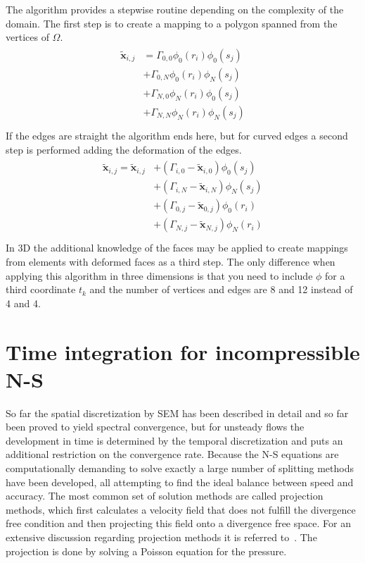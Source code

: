The algorithm provides a stepwise routine depending on the complexity of the domain. The first step is to create 
a mapping to a polygon spanned from the vertices of $\Omega$.
%
\begin{align}
    \begin{split}
    \mathbf{\tilde{x}}_{i,j} 
             &=\Gamma_{0,0}\phi_0(r_i)\phi_0(s_j)\\
             &+\Gamma_{0,N}\phi_0(r_i)\phi_N(s_j)\\
             &+\Gamma_{N,0}\phi_N(r_i)\phi_0(s_j)\\
             &+\Gamma_{N,N}\phi_N(r_i)\phi_N(s_j)\\
    \end{split}
    \label{eq:gh1}
\end{align}
%
If the edges are straight the algorithm ends here, but for curved edges a second step is performed adding 
the deformation of the edges.
%
\begin{align}
    \begin{split}
        \mathbf{\tilde{x}}_{i,j}  = \mathbf{\tilde{x}}_{i,j} 
             &+(\Gamma_{i,0}-\mathbf{\tilde{x}}_{i,0})\phi_0(s_j)\\
             &+(\Gamma_{i,N}-\mathbf{\tilde{x}}_{i,N})\phi_N(s_j)\\
             &+(\Gamma_{0,j}-\mathbf{\tilde{x}}_{0,j})\phi_0(r_i)\\
             &+(\Gamma_{N,j}-\mathbf{\tilde{x}}_{N,j})\phi_N(r_i)\\
    \end{split}
    \label{eq:gh1}
\end{align}
%
In 3D the additional knowledge of the faces may be applied to create mappings from elements with deformed faces as a 
third step. The only difference when applying this algorithm in three dimensions is that you need to include $\phi$
for a third coordinate $t_k$ and the number of vertices and edges are 8 and 12 instead of 
4 and 4.



\section{Time integration for incompressible N-S} \label{timeNS}

So far the spatial discretization by SEM has been described in detail and so far been proved to yield spectral convergence,
but for unsteady flows the development in time is determined by the temporal discretization and puts an additional 
restriction on the convergence rate. Because the N-S equations are computationally demanding to solve exactly 
a large number of splitting methods have been developed, all attempting to find the ideal balance between speed 
and accuracy. The most common set of solution methods are called projection methods, which first calculates 
a velocity field that does not fulfill the divergence free condition and then projecting this field onto a 
divergence free space. For an extensive discussion regarding projection methods it is referred to~\cite{Guermond2006}.
The projection is done by solving a Poisson equation for the pressure. 

